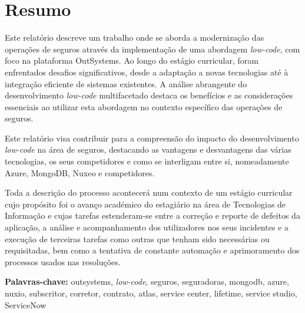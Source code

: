 \section{Resumo}\label{sec:resumo}

    Este relatório descreve um trabalho onde se aborda a modernização das operações de seguros através da implementação de uma abordagem \textit{low-code}, com foco na plataforma OutSystems. Ao longo do estágio curricular, foram enfrentados desafios significativos, desde a adaptação a novas tecnologias até à integração eficiente de sistemas existentes. A análise abrangente do desenvolvimento \textit{low-code} multifacetado destaca os benefícios e as considerações essenciais ao utilizar esta abordagem no contexto específico das operações de seguros. 
    
    Este relatório visa contribuir para a compreensão do impacto do desenvolvimento \textit{low-code} na área de seguros, destacando as vantagens e desvantagens das várias tecnologias, os seus competidores e como se interligam entre si, nomeadamente Azure, MongoDB, Nuxeo e competidores.

    Toda a descrição do processo acontecerá num contexto de um estágio curricular cujo propósito foi o avanço académico do estagiário na área de Tecnologias de Informação e cujas tarefas estenderam-se entre a correção e reporte de defeitos da aplicação, a análise e acompanhamento dos utilizadores nos seus incidentes e a execução de terceiras tarefas como outras que tenham sido necessárias ou requisitadas, bem como a tentativa de constante automação e aprimoramento dos processos usados nas resoluções.  


    \medskip
    \noindent
    {\small{\bf Palavras-chave:} 
    outsystems, \textit{low-code}, seguros, seguradoras, mongodb, azure, nuxio, subscritor, corretor, contrato, atlas, service center, lifetime, service studio, ServiceNow}